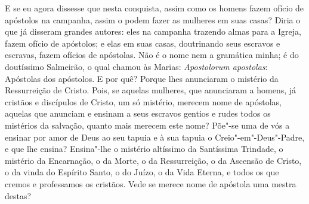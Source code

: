 E se eu agora dissesse que nesta conquista, assim como os homens fazem
ofício de apóstolos na campanha, assim o podem fazer as mulheres em suas
casas? Diria o que já disseram grandes autores: eles na campanha
trazendo almas para a Igreja, fazem ofício de apóstolos; e elas em suas
casas, doutrinando seus escravos e escravas, fazem ofícios de apóstolas.
Não é o nome nem a gramática minha; é do doutíssimo Salmeirão, o qual
chamou às Marias: \emph{Apostolorum apostolas}: Apóstolas dos apóstolos.
E por quê? Porque lhes anunciaram o mistério da Ressurreição de Cristo.
Pois, se aquelas mulheres, que anunciaram a homens, já cristãos e
discípulos de Cristo, um só mistério, merecem nome de apóstolas, aquelas
que anunciam e ensinam a seus escravos gentios e rudes todos os
mistérios da salvação, quanto mais merecem este nome? Põe"-se uma de vós
a ensinar por amor de Deus ao seu tapuia e à sua tapuia o Creio"-em"-Deus"-Padre, e que lhe ensina? Ensina"-lhe o mistério altíssimo da
Santíssima Trindade, o mistério da Encarnação, o da Morte, o da Ressurreição, o da
Ascensão de Cristo, o da vinda do Espírito Santo, o do Juízo, o da Vida
Eterna, e todos os que cremos e professamos os cristãos. Vede se merece
nome de apóstola uma mestra destas?

